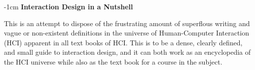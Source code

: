 \newpage \thispagestyle{empty} %
\vspace*{3cm}
\begin{adjustwidth*}{}{-1cm}
  \noindent \textbf{Interaction Design in a Nutshell}

  \vspace*{4pt}
  
  \noindent This is an attempt to dispose of the frustrating amount of superflous writing and vague or non-existent definitions in the universe of Human-Computer Interaction (HCI) apparent in all text books of HCI. This is to be a dense, clearly defined, and small guide to interaction design, and it can both work as an encyclopedia of the HCI universe while also as the text book for a course in the subject.
\end{adjustwidth*}
